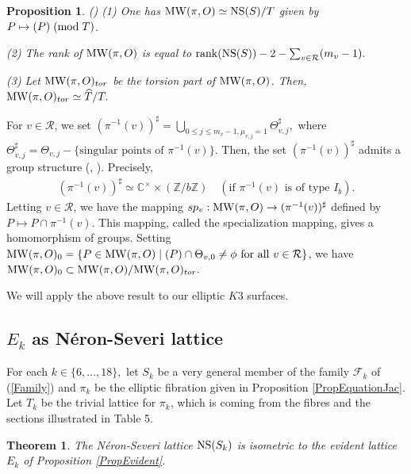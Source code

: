 \documentclass[10pt]{article}
\newtheorem{thm}{Theorem}[section]
\newtheorem{prop}{Proposition}[section]
\begin{document}
\begin{prop}\label{propMW} (\cite{Shioda})
{\rm (1)} One has  ${\rm MW}(\pi,O) \simeq {\rm NS}(S)/T$  given by $P \mapsto (P) \hspace{1mm} ({\rm mod } \hspace{1mm} T)$.

{\rm (2)} 
The rank of ${\rm MW}(\pi,O)$ is equal to ${\rm rank} ({\rm NS}(S))-2- \sum_{v\in \mathcal{R}} (m_v -1).$

{\rm (3)}  
Let ${\rm MW}(\pi,O)_{tor}$ be the torsion part of ${\rm MW}(\pi,O)$. Then,
$
{\rm MW}(\pi,O)_{tor} \simeq \widehat{T}/T.
$
\end{prop}

For $v\in \mathcal{R}$, we set
$
(\pi^{-1} (v))^\sharp = \bigcup_{0\leq j \leq m_v -1, \mu_{v,j} =1} \Theta_{v,j}^\sharp,
$
where
$
\Theta_{v,j}^\sharp = \Theta_{v,j} -\{\text{singular points of } \pi^{-1} (v)\}.
$
Then, the set $(\pi^{-1} (v))^\sharp$ admits a group structure (\cite{Kod}, \cite{Ne}).
Precisely,
\begin{align}\label{NeronHom}
(\pi^{-1} (v))^\sharp \simeq
 \mathbb{C}^\times \times (\mathbb{Z}/b \mathbb{Z}) \quad (\text{if $\pi^{-1}(v)$ is of type $I_b$}).
 \end{align}
Letting $v\in \mathcal{R}$, we have the mapping $sp_v: {\rm MW}(\pi,O) \rightarrow (\pi^{-1} (v))^\sharp$ defined by $P \mapsto P \cap \pi^{-1}(v).$
This mapping, called the specialization mapping, gives a homomorphism of groups.
Setting ${\rm MW}(\pi,O)_0 =\{P\in {\rm MW}(\pi,O) \mid (P) \cap \Theta_{v,0} \not=\phi \text{ for all } v\in \mathcal{R}\}$, we have ${\rm MW}(\pi,O)_0 \subset {\rm MW}(\pi,O)/ {\rm MW}(\pi,O)_{tor}.$

We will apply the above result to our elliptic $K3$ surfaces.



\subsection{$E_k$ as N\'eron-Severi lattice}

For each $k\in \{6, \ldots, 18\},$
let $S_k$ be a very general member of the family $\mathscr{F}_k$ of (\ref{Family})
and $\pi_k$ be the elliptic fibration given in Proposition \ref{PropEquationJac}.
Let $T_k$ be the trivial lattice for $\pi_k$,
which is coming from the  fibres  and the sections  illustrated in Table 5.


 \begin{thm}\label{ThmNSEvident}
The N\'eron-Severi lattice ${\rm NS}(S_k)$ is isometric to the evident lattice $E_k$ of Proposition \ref{PropEvident}.
\end{thm}
\end{document}
